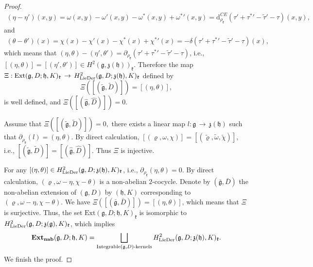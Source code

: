 \documentclass[12pt]{amsart}
\newcommand {\emptycomment}[1]{}
\newcommand{\lon }{\,\rightarrow\,}
\newcommand{\g}{\mathfrak g}
\newcommand{\h}{\mathfrak h}
\newcommand{\frkk}{\mathfrak k}
\newcommand{\frkz}{\mathfrak z}
\newcommand{\dM}{\mathrm{d}}
\newcommand{\LD}{{\rm LieDer }}
\begin{document}
\begin{proof}
\begin{eqnarray*}
(\eta-\eta')(x, y)=\omega(x, y)-\omega'(x, y)-\omega^{*}(x, y)+\omega^{*}{'}(x, y) =\dM^{CE}_{\rho_\frkk}(\tau'+\tau^{*}{'}-\tilde{\tau}{'}-\tau)(x, y),
\end{eqnarray*}
and 
\begin{eqnarray*}
(\theta-\theta')(x)=\chi(x)-\chi'(x)-\chi^*(x)+\chi^{*}{'}(x)=-\delta(\tau'+\tau^{*}{'}-\tilde{\tau}'-\tau)(x),
\end{eqnarray*}
which means that $(\eta, \theta)-(\eta', \theta')=\partial_{\rho_{\frkk}}(\tau'+\tau^{*}{'}-\tilde{\tau}'-\tau)$, i.e.,$[(\eta, \theta)]=[(\eta', \theta')]\in H^{2}(\g, \frkz(\h))_{\frkk}$. Therefore the map  
$\Xi:{\rm Ext}(\g,D; \h, K)_\frkk\lon H_{\LD}^{2}(\g,D; \frkz(\h),K)_\frkk$ defined by
$$
\Xi([(\tilde{\g}, \tilde{D})])=[(\eta, \theta)], 
$$
is well defined, and $\Xi([(\hat{\g}, \hat{D})])=0$.

Assume that $\Xi([(\tilde{\g}, \tilde{D})])=0,$ there exists a linear map $l:\g\lon\frkz(\h)$ such that $\partial_{\rho_{\frkk}}(l)=(\eta, \theta)$. By direct calculation, 
\emptycomment{
	Then
\begin{eqnarray*}
\left\{\begin{array}{rcl}
\varrho(x)u-\tilde{\varrho}(x)u&=&[\tau(x)+l(x), u]_\h,\\
\omega(x, y)-\tilde{\omega}(x, y)&=&\tilde{\varrho}(x)(\tau+l)(y)-\tilde{\varrho}(y)(\tau+l)(x)+[(\tau+l)(x), (\tau+l)(y)]_\h-(l+\tau)([x, y]_\g),\\
\chi(x)-\tilde{\chi}(x)&=&K((\tau+l)(x))-(\tau+l)(D(x)),
\end{array}\right.
\end{eqnarray*}
which means that }$[(\varrho, \omega, \chi)]=[(\tilde{\varrho}, \tilde{\omega}, \tilde{\chi})]$, i.e., $[(\tilde{\g}, \tilde{D})]=[(\hat{\g}, \hat{D})]$. Thus $\Xi$ is injective. 

For any $[(\eta, \theta)]\in H^2_{\LD}(\g,D; \frkz(\h),K)_\frkk$, i.e., $\partial_{\rho_\frkk}(\eta, \theta)=0$. By direct calculation, $(\varrho, \omega-\eta, \chi-\theta)$ is a non-abelian $2$-cocycle. Denote by $(\bar{\g}, \bar{D})$ the non-abelian extension of $(\g, D)$ by $(\h, K)$ corresponding to $(\varrho, \omega-\eta, \chi-\theta)$. We have $\Xi([(\bar{\g}, \bar{D})])=[(\eta, \theta)]$, which means that $\Xi$ is surjective. Thus,
the set $\mathrm{Ext}(\g,D;\h,K)_{\frkk}$ is isomorphic to $H^2_{\LD}(\g,D;\frkz(\g),K)_{\frkk}$, which implies 
\begin{equation*}
      {\rm{\bf Ext_{nab}}}(\g,D;\h,K)=\bigsqcup_{\text{Integrable}(\g,D)\text{-kernels}}H^2_{\LD}(\g,D;\frkz(\h),K)_{\frkk}.
    \end{equation*}
We finish the proof.
    \end{proof}
\end{document}
